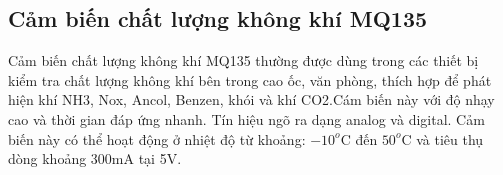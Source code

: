 \newpage
\subsection*{Cảm biến chất lượng không khí MQ135} 
Cảm biến chất lượng không khí MQ135 thường được dùng trong các thiết bị kiểm tra chất lượng không khí bên trong cao ốc, văn phòng, thích hợp để phát hiện khí NH3, Nox, Ancol, Benzen, khói và khí CO2.Cám biến này với độ nhạy cao và thời gian đáp ứng nhanh. Tín hiệu ngõ ra dạng analog và digital. Cảm biến này có thể hoạt động ở nhiệt độ từ khoảng: $-10^{o}$C đến $50^{o}$C và tiêu thụ dòng khoảng 300mA tại 5V.

